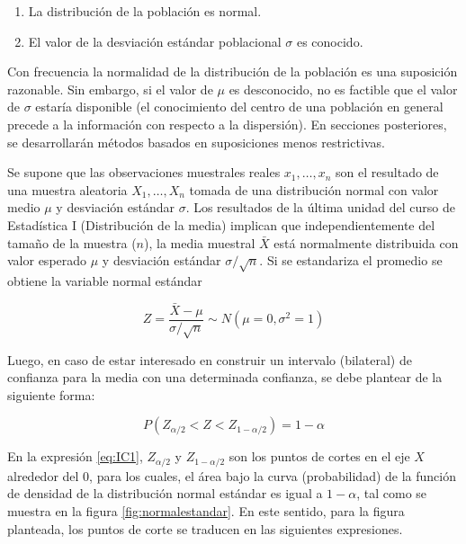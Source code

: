 \documentclass[
  11pt,
]{book}
\providecommand{\tightlist}{%
  \setlength{\itemsep}{0pt}\setlength{\parskip}{0pt}}
\theoremstyle{definition}
\theoremstyle{definition}
\theoremstyle{definition}
\theoremstyle{definition}
\theoremstyle{remark}
\begin{document}
\begin{enumerate}
\def\labelenumi{\arabic{enumi}.}
\tightlist
\item
  La distribución de la población es normal.
\item
  El valor de la desviación estándar poblacional \(\sigma\) es conocido.
\end{enumerate}

Con frecuencia la normalidad de la distribución de la población es una suposición razonable. Sin embargo, si el valor de \(\mu\) es desconocido, no es factible que el valor de \(\sigma\) estaría disponible (el conocimiento del centro de una población en general precede a la información con respecto a la dispersión). En secciones posteriores, se desarrollarán métodos basados en suposiciones menos restrictivas. \citep[página 254]{Devore}

Se supone que las observaciones muestrales reales \(x_1,\ldots , x_n\) son el resultado de una muestra aleatoria \(X_1,\ldots , X_n\) tomada de una distribución normal con valor medio \(\mu\) y desviación estándar \(\sigma\). Los resultados de la última unidad del curso de Estadística I (Distribución de la media) implican que independientemente del tamaño de la muestra (\(n\)), la media muestral \(\bar{X}\) está normalmente distribuida con valor esperado \(\mu\) y desviación estándar \(\sigma/\sqrt{n}\). Si se estandariza el promedio se obtiene la variable normal estándar

\begin{equation}
Z = \frac{\bar{X} - \mu}{\sigma/\sqrt{n}} \sim N(\mu = 0,\sigma^2=1)
\label{eq:normalestandar}
\end{equation}

Luego, en caso de estar interesado en construir un intervalo (bilateral) de confianza para la media con una determinada confianza, se debe plantear de la siguiente forma:

\begin{equation}
P\left( Z_{\alpha/2} < Z < Z_{1-\alpha/2}\right) = 1-\alpha
\label{eq:IC1}
\end{equation}

En la expresión \eqref{eq:IC1}, \(Z_{\alpha/2}\) y \(Z_{1-\alpha/2}\) son los puntos de cortes en el eje \(X\) alrededor del 0, para los cuales, el área bajo la curva (probabilidad) de la función de densidad de la distribución normal estándar es igual a \(1-\alpha\), tal como se muestra en la figura \ref{fig:normalestandar}. En este sentido, para la figura planteada, los puntos de corte se traducen en las siguientes expresiones.
\end{document}
